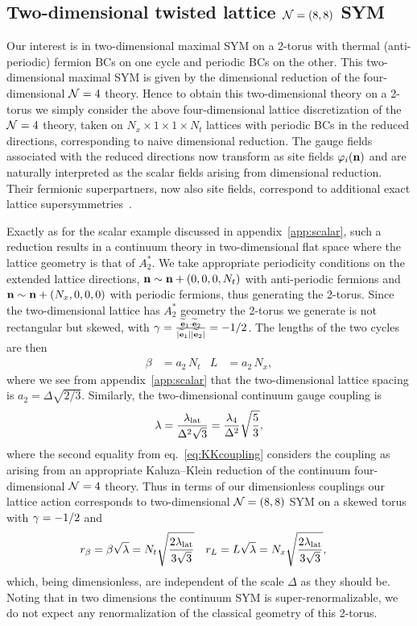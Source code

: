 \subsection{\label{sec:lattice_2d}Two-dimensional twisted lattice $\mathcal N = (8, 8)$ SYM}
Our interest is in two-dimensional maximal SYM on a 2-torus with thermal (anti-periodic) fermion BCs on one cycle and periodic BCs on the other.
This two-dimensional maximal SYM is given by the dimensional reduction of the four-dimensional $\mathcal N = 4$ theory.
Hence to obtain this two-dimensional theory on a 2-torus we simply consider the above four-dimensional lattice discretization of the $\mathcal N = 4$ theory, taken on $N_x \times 1 \times 1 \times N_t$ lattices with periodic BCs in the reduced directions, corresponding to naive dimensional reduction.
The gauge fields associated with the reduced directions now transform as site fields $\varphi_i(\mathbf{n})$ and are naturally interpreted as the scalar fields arising from dimensional reduction.
Their fermionic superpartners, now also site fields, correspond to additional exact lattice supersymmetries~\cite{Damgaard:2008pa}.

Exactly as for the scalar example discussed in appendix~\ref{app:scalar}, such a reduction results in a continuum theory in two-dimensional flat space where the lattice geometry is that of $A_2^*$.
We take appropriate periodicity conditions on the extended lattice directions, $\mathbf{n} \sim \mathbf{n} + (0, 0, 0, N_t)$ with anti-periodic fermions and $\mathbf{n} \sim \mathbf{n} + (N_x, 0, 0, 0)$ with periodic fermions, thus generating the 2-torus.
Since the two-dimensional lattice has $A_2^*$ geometry the 2-torus we generate is not rectangular but skewed, with $\gamma = \frac{\widetilde{\mathbf{e}}_1 \cdot \widetilde{\mathbf{e}}_2}{|\widetilde{\mathbf{e}}_1| |\widetilde{\mathbf{e}}_2|} = -1 / 2$.
The lengths of the two cycles are then
\begin{align}
  \beta & = a_2 \, N_t &
  L & = a_2 \, N_x,
\end{align}
where we see from appendix~\ref{app:scalar} that the two-dimensional lattice spacing is $a_2 = \Delta \sqrt{2 / 3}$.
Similarly, the two-dimensional continuum gauge coupling is
\begin{equation}
  \lambda = \frac{\lambda_{\text{lat}}}{\Delta^2 \sqrt{3}} = \frac{\lambda_4}{\Delta^2} \sqrt{\frac{5}{3}},
\end{equation}
where the second equality from eq.~\eqref{eq:KKcoupling} considers the coupling as arising from an appropriate Kaluza--Klein reduction of the continuum four-dimensional $\mathcal N = 4$ theory.
Thus in terms of our dimensionless couplings our lattice action corresponds to two-dimensional $\mathcal N = (8, 8)$ SYM on a skewed torus with $\gamma = -1 / 2$ and
\begin{align}
  r_{\beta} & = \beta \sqrt{\lambda} = N_t \sqrt{\frac{2\lambda_{\text{lat}}}{3\sqrt{3}}} &
  r_L & = L \sqrt{\lambda} = N_x \sqrt{\frac{2\lambda_{\text{lat}}}{3\sqrt{3}}},
\end{align}
which, being dimensionless, are independent of the scale $\Delta$ as they should be.
Noting that in two dimensions the continuum SYM is super-renormalizable, we do not expect any renormalization of the classical geometry of this 2-torus.

